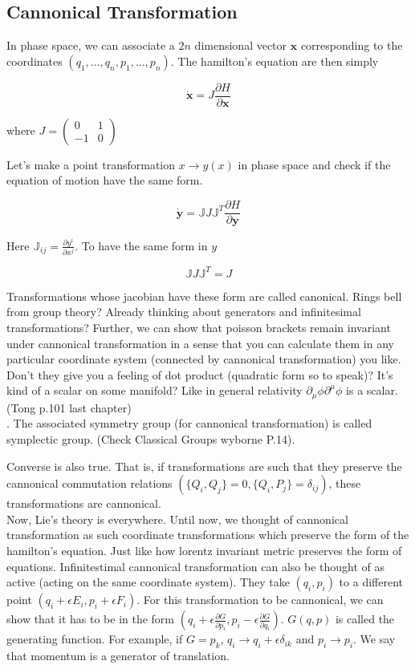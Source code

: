 \documentclass{report}
\begin{document}
\subsection{Cannonical Transformation}

In phase space, we can associate a $2n$ dimensional vector $\boldsymbol{x}$ corresponding to the coordinates $(q_1,...,q_n,p_1,...,p_n)$. The hamilton's equation are then simply

$$\boldsymbol{\dot{x}} = J\frac{\partial H}{\partial \boldsymbol{x}}$$

\noindent where $ J = \begin{pmatrix}
  0 & 1\\
  -1 & 0
\end{pmatrix}$

\noindent Let's make a point transformation $x \rightarrow y(x)$ in phase space and check if the equation of motion have the same form.

$$\boldsymbol{\dot{y}} = \mathbb{J}J\mathbb{J}^T\frac{\partial H}{\partial \boldsymbol{y}}$$

\noindent Here $\mathbb{J}_{ij} = \frac{\partial y^i}{\partial x^j}$. To have the same form in $y$

$$\mathbb{J}J\mathbb{J}^T = J$$

\noindent Transformations whose jacobian have these form are called canonical. Rings bell from group theory? Already thinking about generators and infinitesimal transformations? Further, we can show that poisson brackets remain invariant under cannonical transformation in a sense that you can calculate them in any particular coordinate system (connected by cannonical transformation) you like. Don't they give you a feeling of dot product (quadratic form so to speak)? It's kind of a scalar on some manifold? Like in general relativity $\partial_\mu\phi\partial^\mu\phi$ is a scalar. (Tong p.101 last chapter)\\. The associated symmetry group (for cannonical transformation) is called symplectic group. (Check Classical Groups wyborne P.14).

\noindent Converse is also true. That is, if transformations are such that they preserve the cannonical commutation relations $(\{Q_i,Q_j\}=0, \{Q_i,P_j\}=\delta_{ij})$, these transformations are cannonical.\\

\noindent Now, Lie's theory is everywhere. Until now, we thought of cannonical transformation as such coordinate transformations which preserve the form of the hamilton's equation. Just like how lorentz invariant metric preserves the form of equations. Infinitestimal cannonical transformation can also be thought of as active (acting on the same coordinate system). They take $(q_i,p_i)$ to a different point $(q_i+\epsilon E_i, p_i+\epsilon F_i)$. For this transformation to be cannonical, we can show that it has to be in the form $(q_i+\epsilon\frac{\partial G}{\partial p_i}, p_i-\epsilon\frac{\partial G}{\partial q_i})$. $G(q,p)$ is called the generating function. For example, if $G = p_k$, $q_i \rightarrow q_i+\epsilon\delta_{ik}$ and $p_i\rightarrow p_i$. We say that momentum is a generator of translation.
\end{document}
